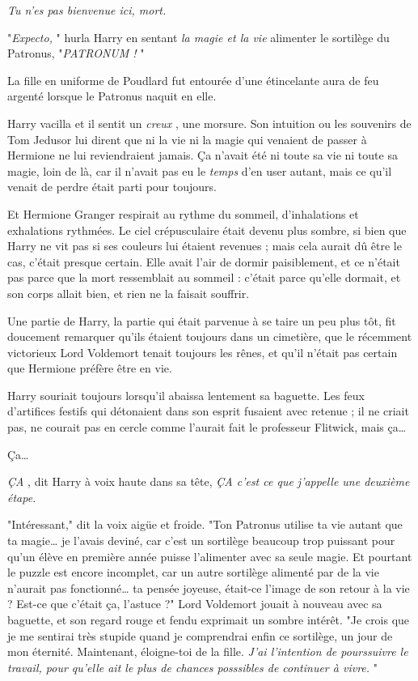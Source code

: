 \emph{Tu n'es pas bienvenue ici, mort.} 

"\emph{Expecto,} " hurla Harry en sentant \emph{la magie et la vie}  alimenter le sortilège du Patronus, "\emph{PATRONUM !} "

La fille en uniforme de Poudlard fut entourée d'une étincelante aura de feu argenté lorsque le Patronus naquit en elle.

Harry vacilla et il sentit un \emph{creux} , une morsure. Son intuition ou les souvenirs de Tom Jedusor lui dirent que ni la vie ni la magie qui venaient de passer à Hermione ne lui reviendraient jamais. Ça n'avait été ni toute sa vie ni toute sa magie, loin de là, car il n'avait pas eu le \emph{temps}  d'en user autant, mais ce qu'il venait de perdre était parti pour toujours.

Et Hermione Granger respirait au rythme du sommeil, d'inhalations et exhalations rythmées. Le ciel crépusculaire était devenu plus sombre, si bien que Harry ne vit pas si ses couleurs lui étaient revenues ; mais cela aurait dû être le cas, c'était presque certain. Elle avait l'air de dormir paisiblement, et ce n'était pas parce que la mort ressemblait au sommeil : c'était parce qu'elle dormait, et son corps allait bien, et rien ne la faisait souffrir.

Une partie de Harry, la partie qui était parvenue à se taire un peu plus tôt, fit doucement remarquer qu'ils étaient toujours dans un cimetière, que le récemment victorieux Lord Voldemort tenait toujours les rênes, et qu'il n'était pas certain que Hermione préfère être en vie.

Harry souriait toujours lorsqu'il abaissa lentement sa baguette. Les feux d'artifices festifs qui détonaient dans son esprit fusaient avec retenue ; il ne criait pas, ne courait pas en cercle comme l'aurait fait le professeur Flitwick, mais ça…

Ça…

\emph{ÇA} , dit Harry à voix haute dans sa tête, \emph{ÇA c'est ce que j'appelle une deuxième étape.} 

"Intéressant," dit la voix aigüe et froide. "Ton Patronus utilise ta vie autant que ta magie… je l'avais deviné, car c'est un sortilège beaucoup trop puissant pour qu'un élève en première année puisse l'alimenter avec sa seule magie. Et pourtant le puzzle est encore incomplet, car un autre sortilège alimenté par de la vie n'aurait pas fonctionné… ta pensée joyeuse, était-ce l'image de son retour à la vie ? Est-ce que c'était ça, l'astuce ?" Lord Voldemort jouait à nouveau avec sa baguette, et son regard rouge et fendu exprimait un sombre intérêt. "Je crois que je me sentirai très stupide quand je comprendrai enfin ce sortilège, un jour de mon éternité. Maintenant, éloigne-toi de la fille. \emph{J'ai l'intention de pourssuivre le travail, pour qu'elle ait le plus de chances posssibles de continuer à vivre.} "

